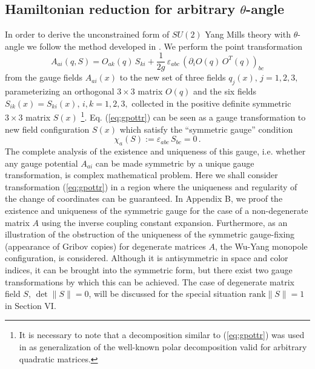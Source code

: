 \documentclass[a4paper,12pt]{article}
\begin{document}

\subsection{Hamiltonian reduction for arbitrary $\theta$-angle}

\label{sec:unhf1}

In order to derive the unconstrained form of $SU(2)$ Yang Mills theory
with $\theta$-angle we follow the method developed in \cite{KP} .
We perform the point transformation
\begin{equation}
\label{eq:gpottr}
A_{ai} \left(q, S \right) =
O_{ak}(q)\, S_{ki} +
\frac{1}{2 g} \,\varepsilon_{abc}\, \left(\partial_i O (q)\, O^T (q) \right)_{bc}
\end{equation}
from the gauge fields $A_{ai}(x)$ to the new set of three
fields $q_j(x),\,j = 1,2,3,$ parameterizing an orthogonal $3 \times 3$ matrix
$O(q)$ and the six fields $S_{ik}(x) = S_{ki}(x),\, i,k = 1,2,3,$
collected in the positive definite symmetric $3 \times 3$ matrix $S(x)$
\footnote{
It is necessary to note that a decomposition similar to (\ref{eq:gpottr})
was used in \cite{Simonov} as generalization of the well-known polar
decomposition valid for arbitrary quadratic matrices.}.
Eq. (\ref{eq:gpottr}) can be seen as a gauge transformation to
new field configuration $S(x)$ which satisfy the ``symmetric gauge''
condition
\begin{equation}
\label{symgauge}
\chi_a(S):= \varepsilon_{abc}\, S_{bc} = 0\,.
\end{equation}
The complete analysis of the existence and uniqueness of this gauge,
i.e. whether any gauge potential $A_{ai}$ can be made symmetric by a
unique gauge transformation, is complex mathematical problem.
Here we shall consider transformation (\ref{eq:gpottr}) in a region where
the uniqueness and regularity of the change of coordinates
can be guaranteed.
In Appendix B, we proof the existence and uniqueness of the symmetric
gauge for the case of a non-degenerate matrix $A$
using the inverse coupling constant expansion.
Furthermore, as an illustration of the obstruction of the uniqueness of
the symmetric gauge-fixing (appearance of Gribov copies) for degenerate
matrices $A$, the Wu-Yang monopole configuration, is considered.
Although it is antisymmetric in space and color indices,
it can be brought into the symmetric form, but there exist two
gauge transformations by which this can be achieved.
The case of degenerate matrix field $S$, $\det\|S\|=0$, will be discussed
for the special situation $\mbox{rank}\|S\|=1$ in Section VI.
\end{document}
